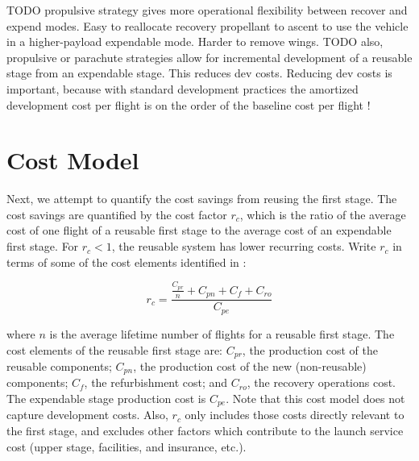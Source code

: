 \documentclass[conf]{new-aiaa}
\begin{document}
TODO propulsive strategy gives more operational flexibility between recover and expend modes. Easy to reallocate recovery propellant to ascent to use the vehicle in a higher-payload expendable mode.  Harder to remove wings.
TODO also, propulsive or parachute strategies allow for incremental development of a reusable stage from an expendable stage. This reduces dev costs. Reducing dev costs is important, because with standard development practices the amortized development cost per flight is on the order of the baseline cost per flight \cite{transcost}! 


\section{Cost Model}
Next, we attempt to quantify the cost savings from reusing the first stage. The cost savings are quantified by the cost factor $r_c$, which is the ratio of the average cost of one flight of a reusable first stage to the average cost of an expendable first stage. For $r_c < 1$, the reusable system has lower recurring costs. Write $r_c$ in terms of some of the cost elements identified in \cite{Sforza2015}:

\begin{equation}
\label{eq:cost_elements}
r_c = \frac{\frac{C_{pr}}{n} + C_{pn} + C_f + C_{ro}}{C_{pe}}
\end{equation}

where $n$ is the average lifetime number of flights for a reusable first stage. The cost elements of the reusable first stage are: $C_{pr}$, the production cost of the reusable components; $C_{pn}$, the production cost of the new (non-reusable) components; $C_f$, the refurbishment cost; and $C_{ro}$, the recovery operations cost. The expendable stage production cost is $C_{pe}$. Note that this cost model does not capture development costs. Also, $r_c$ only includes those costs directly relevant to the first stage, and excludes other factors which contribute to the launch service cost (upper stage, facilities, and insurance, etc.).
\end{document}
